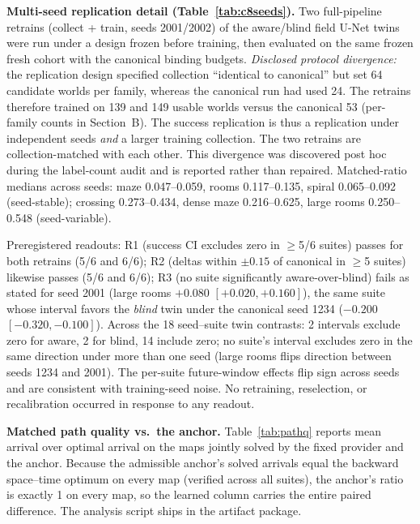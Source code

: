 \documentclass[letterpaper]{article} %
\begin{document}
\textbf{Multi-seed replication detail (Table~\ref{tab:c8seeds}).} Two full-pipeline retrains (collect + train, seeds 2001/2002) of the aware/blind field U-Net twins were run under a design frozen before training, then evaluated on the same frozen fresh cohort with the canonical binding budgets. \emph{Disclosed protocol divergence:} the replication design specified collection ``identical to canonical'' but set 64 candidate worlds per family, whereas the canonical run had used 24. The retrains therefore trained on 139 and 149 usable worlds versus the canonical 53 (per-family counts in Section~B). The success replication is thus a replication under independent seeds \emph{and} a larger training collection. The two retrains are collection-matched with each other. This divergence was discovered post hoc during the label-count audit and is reported rather than repaired. Matched-ratio medians across seeds: maze 0.047--0.059, rooms 0.117--0.135, spiral 0.065--0.092 (seed-stable); crossing 0.273--0.434, dense maze 0.216--0.625, large rooms 0.250--0.548 (seed-variable).

Preregistered readouts: R1 (success CI excludes zero in $\geq$5/6 suites) passes for both retrains (5/6 and 6/6); R2 (deltas within $\pm 0.15$ of canonical in $\geq$5 suites) likewise passes (5/6 and 6/6); R3 (no suite significantly aware-over-blind) fails as stated for seed 2001 (large rooms $+0.080$ $[+0.020,+0.160]$), the same suite whose interval favors the \emph{blind} twin under the canonical seed 1234 ($-0.200$ $[-0.320,-0.100]$). Across the 18 seed--suite twin contrasts: 2 intervals exclude zero for aware, 2 for blind, 14 include zero; no suite's interval excludes zero in the same direction under more than one seed (large rooms flips direction between seeds 1234 and 2001). The per-suite future-window effects flip sign across seeds and are consistent with training-seed noise. No retraining, reselection, or recalibration occurred in response to any readout.

\textbf{Matched path quality vs.\ the anchor.} Table~\ref{tab:pathq} reports mean arrival over optimal arrival on the maps jointly solved by the fixed provider and the anchor. Because the admissible anchor's solved arrivals equal the backward space--time optimum on every map (verified across all suites), the anchor's ratio is exactly 1 on every map, so the learned column carries the entire paired difference. The analysis script ships in the artifact package.
\end{document}
